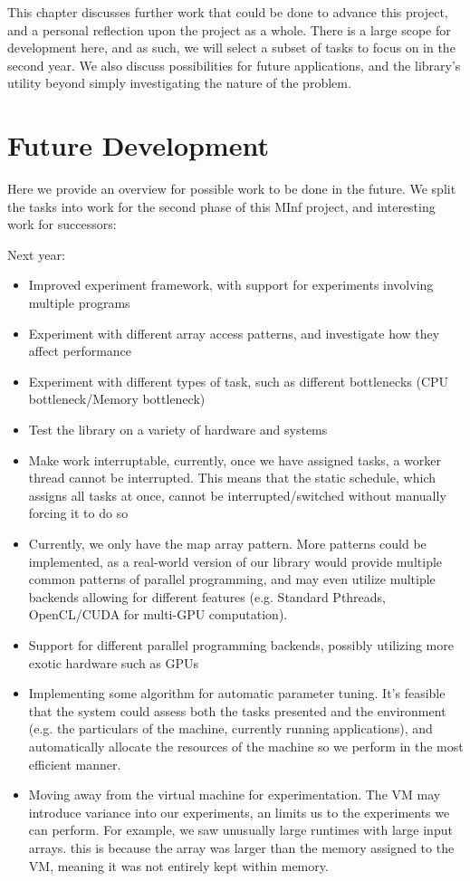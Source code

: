 
This chapter discusses further work that could be done to advance this project, and a personal reflection upon the project as a whole. There is a large scope for development here, and as such, we will select a subset of tasks to focus on in the second year. We also discuss possibilities for future applications, and the library's utility beyond simply investigating the nature of the problem.



\section{Future Development}

Here we provide an overview for possible work to be done in the future. We split the tasks into work for the second phase of this MInf project, and interesting work for successors:

Next year:

\begin{itemize}
	\item Improved experiment framework, with support for experiments involving multiple programs
	\item Experiment with different array access patterns, and investigate how they affect performance
	\item Experiment with different types of task, such as different bottlenecks (CPU bottleneck/Memory bottleneck) 
	\item Test the library on a variety of hardware and systems
	\item Make work interruptable, currently, once we have assigned tasks, a worker thread cannot be interrupted. This means that the static schedule, which assigns all tasks at once, cannot be interrupted/switched without manually forcing it to do so
	\item Currently, we only have the map array pattern. More patterns could be implemented, as a real-world version of our library would provide multiple common patterns of parallel programming, and may even utilize multiple backends allowing for different features (e.g. Standard Pthreads, OpenCL/CUDA for multi-GPU computation).
	\item Support for different parallel programming backends, possibly utilizing more exotic hardware such as GPUs 
	\item Implementing some algorithm for automatic parameter tuning. It's feasible that the system could assess both the tasks presented and the environment (e.g. the particulars of the machine, currently running applications), and automatically allocate the resources of the machine so we perform in the most efficient manner.
	\item Moving away from the virtual machine for experimentation. The VM may introduce variance into our experiments, an limits us to the experiments we can perform. For example, we saw unusually large runtimes with large input arrays. this is because the array was larger than the memory assigned to the VM, meaning it was not entirely kept within memory.
\end{itemize}


